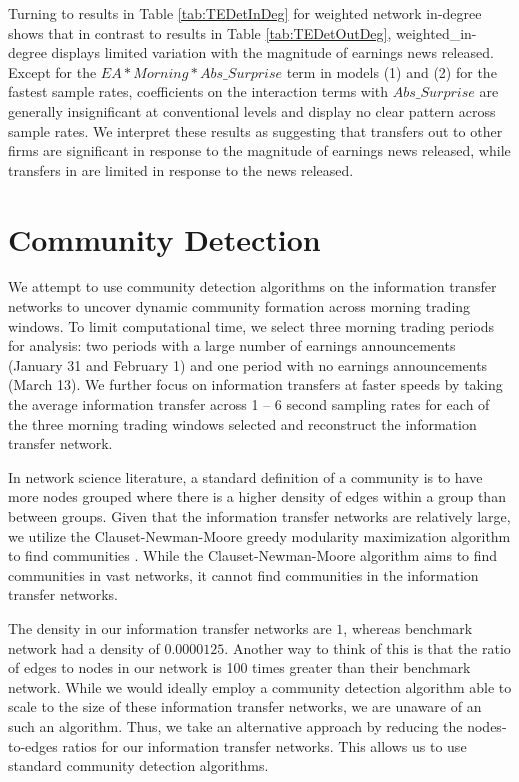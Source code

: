 Turning to results in Table \ref{tab:TEDetInDeg} for weighted network in-degree shows that in contrast to results in Table \ref{tab:TEDetOutDeg},  weighted\_in-degree displays limited variation with the magnitude of earnings news released. Except for the \(EA*Morning*Abs\_Surprise\) term in models (1) and (2) for the fastest sample rates, coefficients on the interaction terms with \(Abs\_Surprise\) are generally insignificant at conventional levels and display no clear pattern across sample rates. We interpret these results as suggesting that transfers out to other firms are significant in response to the magnitude of earnings news released, while transfers in are limited in response to the news released.

\section{Community Detection}

We attempt to use community detection algorithms on the information transfer networks to uncover dynamic community formation across morning trading windows.  To limit computational time, we select three morning trading periods for analysis: two periods with a large number of earnings announcements (January 31 and February 1) and one period with no earnings announcements (March 13). We further focus on information transfers at faster speeds by taking the average information transfer across 1 – 6 second sampling rates for each of the three morning trading windows selected and reconstruct the information transfer network.  

In network science literature,  a standard definition of a community is to have more nodes grouped where there is a higher density of edges within a group than between groups.  Given that the information transfer networks are relatively large, we utilize the Clauset-Newman-Moore greedy modularity maximization algorithm to find communities \citep[see][]{Clauset2005}.  While the Clauset-Newman-Moore algorithm aims to find communities in vast networks, it cannot find communities in the information transfer networks. 

The density in our information transfer networks are \(1\), whereas \cite{Clauset2005} benchmark network had a density of \(0.0000125\). Another way to think of this is that the ratio of edges to nodes in our network is 100 times greater than their benchmark network.  While we would ideally employ a community detection algorithm able to scale to the size of these information transfer networks, we are unaware of an such an algorithm.  Thus, we take an alternative approach by reducing the nodes-to-edges ratios for our information transfer networks. This allows us to use standard community detection algorithms.  

